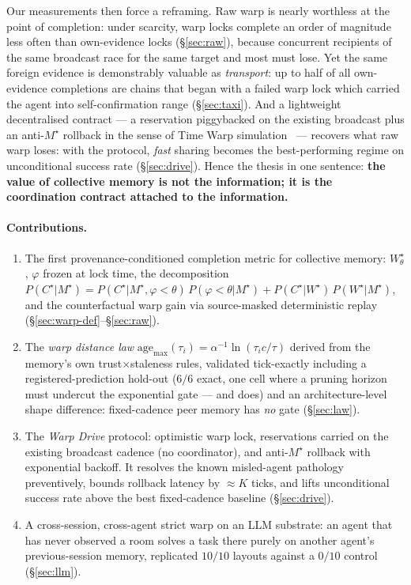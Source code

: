 \documentclass{article}
\newcommand{\wstar}{W^{\star}}
\newcommand{\mstar}{M^{\star}}
\newcommand{\cstar}{C^{\star}}
\begin{document}
Our measurements then force a reframing. Raw warp is nearly worthless
at the point of completion: under scarcity, warp locks complete an
order of magnitude less often than own-evidence locks
(\S\ref{sec:raw}), because concurrent recipients of the same broadcast
race for the same target and most must lose. Yet the same foreign
evidence is demonstrably valuable as \emph{transport}: up to half of
all own-evidence completions are chains that began with a failed warp
lock which carried the agent into self-confirmation range
(\S\ref{sec:taxi}). And a lightweight decentralised contract --- a
reservation piggybacked on the existing broadcast plus an
anti-$\mstar$ rollback in the sense of Time Warp
simulation~\cite{jefferson1985}
--- recovers what raw warp loses: with the protocol, \emph{fast}
sharing becomes the best-performing regime on unconditional success
rate (\S\ref{sec:drive}). Hence the thesis in one sentence:
\textbf{the value of collective memory is not the information; it is
the coordination contract attached to the information.}

\paragraph{Contributions.}
\begin{enumerate}[leftmargin=20pt,itemsep=2pt,topsep=2pt]
\item The first provenance-conditioned completion metric for
  collective memory: $\wstar_\theta$, $\varphi$ frozen at lock time,
  the decomposition
  $P(\cstar|\mstar)=P(\cstar|\mstar,\varphi{<}\theta)\,P(\varphi{<}\theta|\mstar)
  + P(\cstar|\wstar)\,P(\wstar|\mstar)$, and the counterfactual warp
  gain via source-masked deterministic replay
  (\S\ref{sec:warp-def}--\S\ref{sec:raw}).
\item The \emph{warp distance law}
  $\mathrm{age}_{\max}(\tau_i)=\alpha^{-1}\ln(\tau_i c/\tau)$ derived
  from the memory's own trust$\times$staleness rules, validated
  tick-exactly including a registered-prediction hold-out ($6/6$
  exact, one cell where a pruning horizon must undercut the
  exponential gate --- and does) and an architecture-level shape
  difference: fixed-cadence peer memory has \emph{no} gate
  (\S\ref{sec:law}).
\item The \emph{Warp Drive} protocol: optimistic warp lock,
  reservations carried on the existing broadcast cadence (no
  coordinator), and anti-$\mstar$ rollback with exponential backoff.
  It resolves the known misled-agent pathology preventively, bounds
  rollback latency by ${\approx}K$ ticks, and lifts unconditional
  success rate above the best fixed-cadence baseline
  (\S\ref{sec:drive}).
\item A cross-session, cross-agent strict warp on an LLM substrate:
  an agent that has never observed a room solves a task there purely
  on another agent's previous-session memory, replicated $10/10$
  layouts against a $0/10$ control (\S\ref{sec:llm}).
\end{enumerate}
\end{document}
